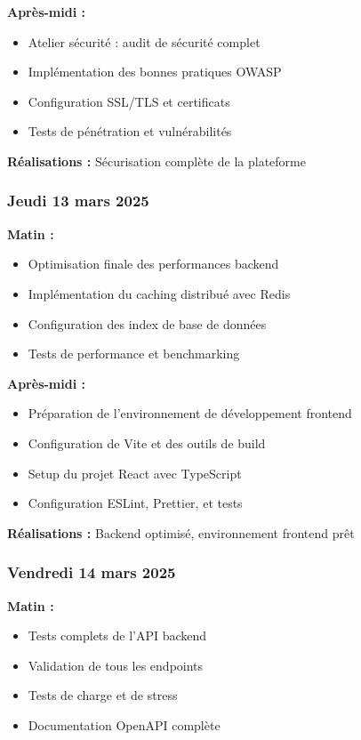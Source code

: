 \documentclass[a4paper,12pt]{article}
\begin{document}
\textbf{Après-midi :}
\begin{itemize}
    \item Atelier sécurité : audit de sécurité complet
    \item Implémentation des bonnes pratiques OWASP
    \item Configuration SSL/TLS et certificats
    \item Tests de pénétration et vulnérabilités
\end{itemize}

\textbf{Réalisations :} Sécurisation complète de la plateforme

\subsubsection*{Jeudi 13 mars 2025}
\textbf{Matin :}
\begin{itemize}
    \item Optimisation finale des performances backend
    \item Implémentation du caching distribué avec Redis
    \item Configuration des index de base de données
    \item Tests de performance et benchmarking
\end{itemize}

\textbf{Après-midi :}
\begin{itemize}
    \item Préparation de l'environnement de développement frontend
    \item Configuration de Vite et des outils de build
    \item Setup du projet React avec TypeScript
    \item Configuration ESLint, Prettier, et tests
\end{itemize}

\textbf{Réalisations :} Backend optimisé, environnement frontend prêt

\subsubsection*{Vendredi 14 mars 2025}
\textbf{Matin :}
\begin{itemize}
    \item Tests complets de l'API backend
    \item Validation de tous les endpoints
    \item Tests de charge et de stress
    \item Documentation OpenAPI complète
\end{itemize}
\end{document}
